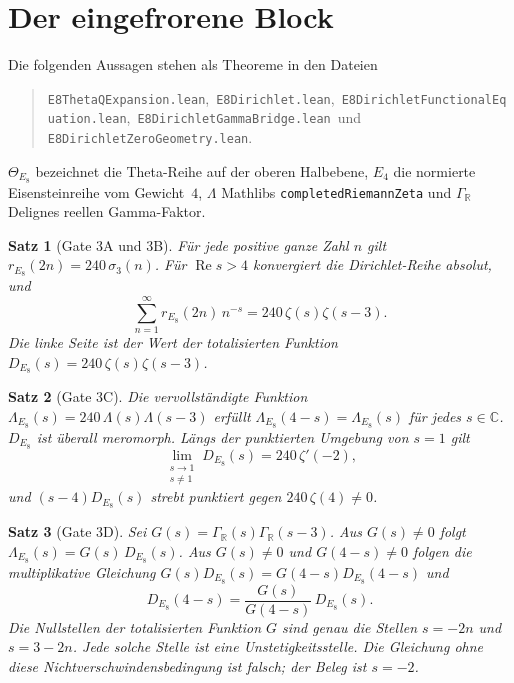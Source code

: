 \documentclass[11pt,a4paper]{article}
\newtheorem{theorem}{Satz}[section]
\begin{document}
\section{Der eingefrorene Block}

Die folgenden Aussagen stehen als Theoreme in den Dateien
\begin{quote}\raggedright
\texttt{E8ThetaQExpansion.lean},\ 
\texttt{E8Dirichlet.lean},\ 
\texttt{E8DirichletFunctionalEquation.lean},\ 
\texttt{E8DirichletGammaBridge.lean}\ und
\texttt{E8DirichletZeroGeometry.lean}.
\end{quote}
$\Theta_{E_8}$ bezeichnet die Theta-Reihe auf der oberen Halbebene,
$E_4$ die normierte Eisensteinreihe vom Gewicht~$4$,
$\Lambda$ Mathlibs \texttt{completedRiemannZeta} und
$\Gamma_{\mathbb{R}}$ Delignes reellen Gamma-Faktor.

\begin{theorem}[Gate 3A und 3B]
  F\"ur jede positive ganze Zahl $n$ gilt
  $r_{E_8}(2n)=240\,\sigma_3(n)$.
  F\"ur $\operatorname{Re}s>4$ konvergiert die Dirichlet-Reihe absolut,
  und
  \[
    \sum_{n=1}^{\infty} r_{E_8}(2n)\,n^{-s}
    = 240\,\zeta(s)\zeta(s-3).
  \]
  Die linke Seite ist der Wert der totalisierten Funktion
  $D_{E_8}(s)=240\,\zeta(s)\zeta(s-3)$.
\end{theorem}

\begin{theorem}[Gate 3C]
  Die vervollst\"andigte Funktion
  $\Lambda_{E_8}(s)=240\,\Lambda(s)\Lambda(s-3)$
  erf\"ullt $\Lambda_{E_8}(4-s)=\Lambda_{E_8}(s)$ f\"ur jedes
  $s\in\mathbb{C}$.
  $D_{E_8}$ ist \"uberall meromorph. L\"angs der punktierten Umgebung
  von $s=1$ gilt
  \[
    \lim_{\substack{s\to 1\\ s\neq 1}} D_{E_8}(s)
    = 240\,\zeta'(-2),
  \]
  und $(s-4)D_{E_8}(s)$ strebt punktiert gegen $240\,\zeta(4)\neq 0$.
\end{theorem}

\begin{theorem}[Gate 3D]
  Sei $G(s)=\Gamma_{\mathbb{R}}(s)\Gamma_{\mathbb{R}}(s-3)$.
  Aus $G(s)\neq 0$ folgt $\Lambda_{E_8}(s)=G(s)\,D_{E_8}(s)$.
  Aus $G(s)\neq 0$ und $G(4-s)\neq 0$ folgen die multiplikative
  Gleichung $G(s)D_{E_8}(s)=G(4-s)D_{E_8}(4-s)$ und
  \[
    D_{E_8}(4-s)
    = \frac{G(s)}{G(4-s)}\,D_{E_8}(s).
  \]
  Die Nullstellen der totalisierten Funktion $G$ sind genau die Stellen
  $s=-2n$ und $s=3-2n$. Jede solche Stelle ist eine
  Unstetigkeitsstelle. Die Gleichung ohne diese
  Nichtverschwindensbedingung ist falsch; der Beleg ist $s=-2$.
\end{theorem}
\end{document}
